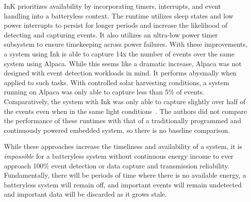 InK prioritizes availability by incorporating timers, interrupts, and event handling into a batteryless context.
The runtime utilizes sleep states and low power interrupts to persist for longer periods and increase the likelihood of detecting and capturing events. It also utilizes an ultra-low power timer subsystem to ensure timekeeping across power failures.
With these improvements, a system using Ink is able to capture 14x the number of events over the same system using Alpaca.
While this seems like a dramatic increase, Alpaca was not designed with event detection workloads in mind. It performs abysmally 
when applied to such tasks. With controlled solar harvesting conditions, a system running on Alpaca was only able to capture less than 5\% of events. 
Comparatively, the system with Ink was only able to capture slightly over half of the events even when in the same light conditions~\cite{yildirim2018ink}. The authors did not compare the performance of these runtimes with that of a traditionally programmed and continuously powered embedded system, so there is no baseline comparison.

While these approaches increase the timeliness and availability of a system,
it is \textit{impossible} for a batteryless system without continuous energy income to ever approach 100\% event detection or data capture and transmission reliability.
Fundamentally, there will be periods of time where there is no available energy, a batteryless system will remain off, and important events will remain undetected and important data will be discarded as it grows stale.


